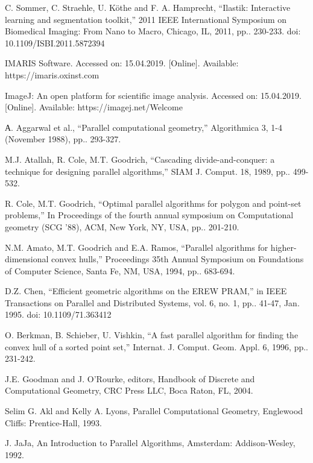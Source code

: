 \documentclass[conference]{IEEEtran}
\theoremstyle{plane}
\begin{document}
\begin{thebibliography}{00}
	 C. Sommer, C. Straehle, U. Köthe and F. A. Hamprecht, ``Ilastik: Interactive learning and segmentation toolkit,'' 2011 IEEE International Symposium on Biomedical Imaging: From Nano to Macro, Chicago, IL, 2011, pp.. 230-233.
	doi: 10.1109/ISBI.2011.5872394
	
	 IMARIS Software. Accessed on: 15.04.2019. [Online]. Available: https://imaris.oxinst.com
	
	 ImageJ: An open platform for scientific image analysis. Accessed on: 15.04.2019. [Online]. Available: https://imagej.net/Welcome
	
	 А. Aggarwal et al., ``Parallel computational geometry,'' Algorithmica 3, 1-4 (November 1988), pp.. 293-327.
	
	 M.J. Atallah, R. Cole, M.T. Goodrich, ``Cascading divide-and-conquer: a technique for designing parallel algorithms,'' SIAM J. Comput. 18, 1989, pp.. 499-532.
	
	 R. Cole, M.T. Goodrich, ``Optimal parallel algorithms for polygon and point-set problems,'' In Proceedings of the fourth annual symposium on Computational geometry (SCG '88), ACM, New York, NY, USA, pp.. 201-210.
	
	 N.M. Amato, M.T. Goodrich and E.A. Ramos, ``Parallel algorithms for higher-dimensional convex hulls,'' Proceedings 35th Annual Symposium on Foundations of Computer Science, Santa Fe, NM, USA, 1994, pp.. 683-694.
	
	 D.Z. Chen, ``Efficient geometric algorithms on the EREW PRAM,'' in IEEE Transactions on Parallel and Distributed Systems, vol. 6, no. 1, pp.. 41-47, Jan. 1995.
	doi: 10.1109/71.363412
	
	 O. Berkman, B. Schieber, U. Vishkin, ``A fast parallel algorithm for finding the convex hull of a sorted point set,'' Internat. J. Comput. Geom. Appl. 6, 1996, pp.. 231-242.
	
	 J.E. Goodman and J. O'Rourke, editors,  Handbook of Discrete and Computational Geometry, CRC Press LLC, Boca Raton, FL, 2004.

	 Selim G. Akl and Kelly A. Lyons, Parallel Computational Geometry, Englewood Cliffs: Prentice-Hall, 1993.
	
	 J. JaJa, An Introduction to Parallel Algorithms, Amsterdam: Addison-Wesley, 1992.
	

\end{thebibliography}
\end{document}
